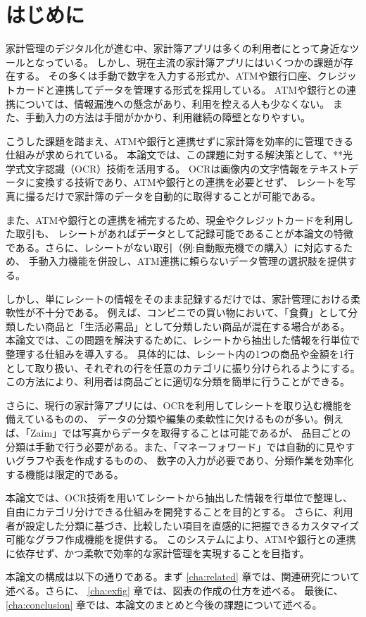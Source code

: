 \documentclass[main]{subfiles}
\begin{document}
\chapter{はじめに}
\label{cha:intro}

家計管理のデジタル化が進む中、家計簿アプリは多くの利用者にとって身近なツールとなっている。
しかし、現在主流の家計簿アプリにはいくつかの課題が存在する。
その多くは手動で数字を入力する形式か、ATMや銀行口座、クレジットカードと連携してデータを管理する形式を採用している。
ATMや銀行との連携については、情報漏洩への懸念があり、利用を控える人も少なくない。
また、手動入力の方法は手間がかかり、利用継続の障壁となりやすい。

こうした課題を踏まえ、ATMや銀行と連携せずに家計簿を効率的に管理できる仕組みが求められている。
本論文では、この課題に対する解決策として、**光学式文字認識（OCR）技術を活用する。
OCRは画像内の文字情報をテキストデータに変換する技術であり、ATMや銀行との連携を必要とせず、
レシートを写真に撮るだけで家計簿のデータを自動的に取得することが可能である。

また、ATMや銀行との連携を補完するため、現金やクレジットカードを利用した取引も、
レシートがあればデータとして記録可能であることが本論文の特徴である。さらに、レシートがない取引（例:自動販売機での購入）に対応するため、
手動入力機能を併設し、ATM連携に頼らないデータ管理の選択肢を提供する。

しかし、単にレシートの情報をそのまま記録するだけでは、家計管理における柔軟性が不十分である。
例えば、コンビニでの買い物において、「食費」として分類したい商品と「生活必需品」として分類したい商品が混在する場合がある。
本論文では、この問題を解決するために、レシートから抽出した情報を行単位で整理する仕組みを導入する。
具体的には、レシート内の1つの商品や金額を1行として取り扱い、それぞれの行を任意のカテゴリに振り分けられるようにする。
この方法により、利用者は商品ごとに適切な分類を簡単に行うことができる。

さらに、現行の家計簿アプリには、OCRを利用してレシートを取り込む機能を備えているものの、
データの分類や編集の柔軟性に欠けるものが多い。例えば、「Zaim」では写真からデータを取得することは可能であるが、
品目ごとの分類は手動で行う必要がある。また、「マネーフォワード」では自動的に見やすいグラフや表を作成するものの、
数字の入力が必要であり、分類作業を効率化する機能は限定的である。

本論文では、OCR技術を用いてレシートから抽出した情報を行単位で整理し、自由にカテゴリ分けできる仕組みを開発することを目的とする。
さらに、利用者が設定した分類に基づき、比較したい項目を直感的に把握できるカスタマイズ可能なグラフ作成機能を提供する。
このシステムにより、ATMや銀行との連携に依存せず、かつ柔軟で効率的な家計管理を実現することを目指す。

本論文の構成は以下の通りである。まず \ref{cha:related} 章では、関連研究について述べる。さらに、
\ref{cha:exfig} 章では、図表の作成の仕方を述べる。
最後に、\ref{cha:conclusion} 章では、本論文のまとめと今後の課題について述べる。
\end{document}
